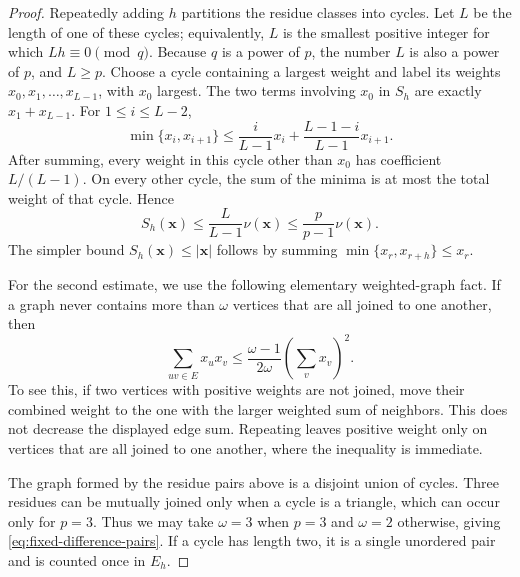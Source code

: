 \documentclass[11pt]{article}
\numberwithin{equation}{section}
\theoremstyle{remark}
\begin{document}
\begin{proof}
Repeatedly adding $h$ partitions the residue classes into cycles.  Let $L$ be the length of one of these cycles; equivalently, $L$ is the
smallest positive integer for which $Lh\equiv0\pmod q$.  Because $q$ is a
power of $p$, the number $L$ is also a power of $p$, and $L\ge p$.
Choose a cycle containing a largest weight and label its weights
$x_0,x_1,\ldots,x_{L-1}$, with $x_0$ largest.  The two terms involving
$x_0$ in $S_h$ are exactly $x_1+x_{L-1}$.  For $1\le i\le L-2$,
\[
 \min\{x_i,x_{i+1}\}
 \le \frac{i}{L-1}x_i+\frac{L-1-i}{L-1}x_{i+1}.
\]
After summing, every weight in this cycle other than $x_0$ has coefficient
$L/(L-1)$.  On every other cycle, the sum of the minima is at most the total
weight of that cycle.  Hence
\[
 S_h(\mathbf x)
 \le\frac{L}{L-1}\nu(\mathbf x)
 \le\frac{p}{p-1}\nu(\mathbf x).
\]
The simpler bound $S_h(\mathbf x)\le|\mathbf x|$ follows by summing
$\min\{x_r,x_{r+h}\}\le x_r$.

For the second estimate, we use the following elementary weighted-graph
fact.  If a graph never contains more than $\omega$ vertices that are all
joined to one another, then
\[
 \sum_{uv\in E}x_ux_v
 \le\frac{\omega-1}{2\omega}\left(\sum_vx_v\right)^2.
\]
To see this, if two vertices with positive weights are not joined, move their
combined weight to the one with the larger weighted sum of neighbors.  This
does not decrease the displayed edge sum.  Repeating leaves positive weight
only on vertices that are all joined to one another, where the inequality is
immediate.

The graph formed by the residue pairs above is a disjoint union of cycles.
Three residues can be mutually joined only when a cycle is a triangle, which
can occur only for $p=3$.  Thus we may take $\omega=3$ when $p=3$ and
$\omega=2$ otherwise, giving \eqref{eq:fixed-difference-pairs}.  If a cycle has
length two, it is a single unordered pair and is counted once in
$E_h$.
\end{proof}
\end{document}
